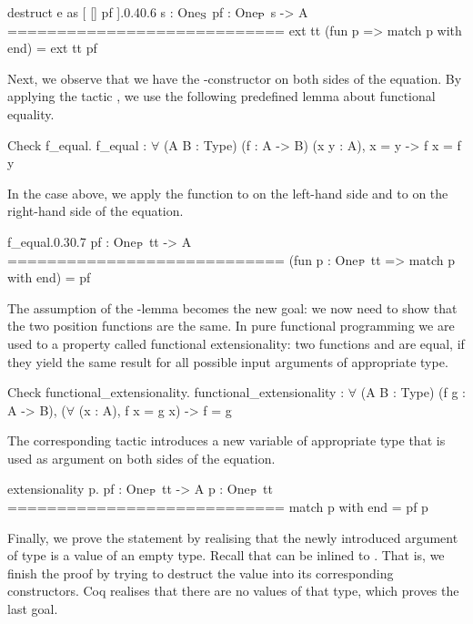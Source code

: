 \begin{cproof1}{destruct e as [ [] pf ].}{0.4}{0.6}
  s : One\(\sb{\text{S}}\)
  pf : One\(\sb{\text{P}}\) s -> A
  ============================
  ext tt (fun p => match p with end) =
  ext tt pf
\end{cproof1}

Next, we observe that we have the -constructor on both sides of the equation.
By applying the tactic , we use the following predefined lemma about functional equality.

\begin{crepl}
\coqrepl Check f_equal.
  f_equal : \(\forall\) (A B : Type) (f : A -> B) (x y : A), x = y -> f x = f y
\end{crepl}

In the case above, we apply the function  to  on the left-hand side and to  on the right-hand side of the equation.
 
\begin{cproof1}{f_equal.}{0.3}{0.7}
  pf : One\(\sb{\text{P}}\) tt -> A
  ============================
  (fun p : One\(\sb{\text{P}}\) tt => match p with end) = pf
\end{cproof1}

The assumption of the -lemma becomes the new goal: we now need to show that the two position functions are the same.
In pure functional programming we are used to a property called functional extensionality: two functions  and  are equal, if they yield the same result for all possible input arguments of appropriate type.

\begin{crepl}
\coqrepl Check  functional_extensionality.
  functional_extensionality : \(\forall\) (A B : Type) (f g : A -> B),
    (\(\forall\) (x : A), f x = g x) -> f = g
\end{crepl}

The corresponding tactic  introduces a new variable  of appropriate type that is used as argument on both sides of the equation.

\begin{cproof}{extensionality p.}
  pf : One\(\sb{\text{P}}\) tt -> A
  p : One\(\sb{\text{P}}\) tt
  ============================
  match p with end = pf p
\end{cproof}

Finally, we prove the statement by realising that the newly introduced argument  of type  is a value of an empty type.
Recall that  can be inlined to .
That is, we finish the proof by trying to destruct the value  into its corresponding constructors.
Coq realises that there are no values of that type, which proves the last goal.

